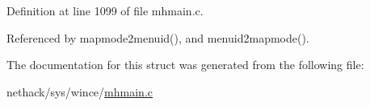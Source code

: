 Definition at line 1099 of file mhmain.\+c.



Referenced by mapmode2menuid(), and menuid2mapmode().



The documentation for this struct was generated from the following file\+:\begin{DoxyCompactItemize}
\item 
nethack/sys/wince/\hyperlink{sys_2wince_2mhmain_8c}{mhmain.\+c}\end{DoxyCompactItemize}
